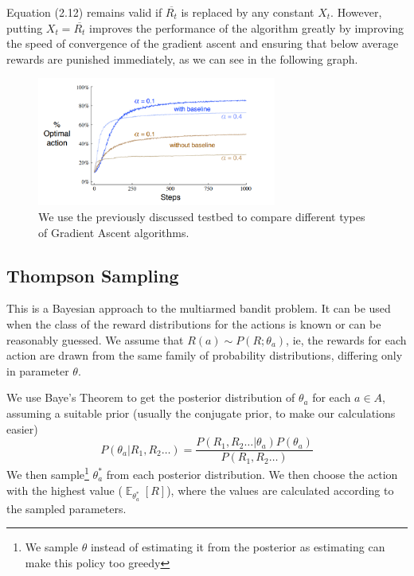 \documentclass[12pt]{report}
\begin{document}
Equation (2.12) remains valid if $\overline{R_{t}}$ is replaced by any constant $X_{t}$. However, putting $X_{t} = \overline{R_{t}}$ improves the performance of the algorithm greatly by improving the speed of convergence of the gradient ascent and ensuring that below average rewards are punished immediately, as we can see in the following graph.
\begin{figure}[H]
    \centering
    \includegraphics[width=0.7\textwidth]{images/gradient-bandit.png}
    \caption{We use the previously discussed testbed to compare different types of Gradient Ascent algorithms.}
\end{figure}

\subsection{Thompson Sampling}
This is a Bayesian approach to the multiarmed bandit problem. It can be used when the class of the reward distributions for the actions is known or can be reasonably guessed.
We assume that $R(a) \sim P(R; \theta_{a})$, ie, the rewards for each action are drawn from the same family of probability distributions, differing only in parameter $\theta$.

We use Baye's Theorem to get the posterior distribution of $\theta_{a}$ for each $a \in A$, assuming a suitable prior (usually the conjugate prior, to make our calculations easier)
\begin{equation}
    P(\theta_{a} | R_{1}, R_{2} \dots) = \frac{P(R_{1}, R_{2} \dots | \theta_{a})P(\theta_{a})}{P(R_{1}, R_{2} \dots)}
\end{equation}
We then sample\footnote{We sample $\theta$ instead of estimating it from the posterior as estimating can make this policy too greedy} $\theta^{*}_{a}$ from each posterior distribution. We then choose the action with the highest value ($\mathop{\mathbb{E}}_{\theta^{*}_{a}}\left[R\right]$), where the values are calculated according to the 
sampled parameters.
\end{document}

